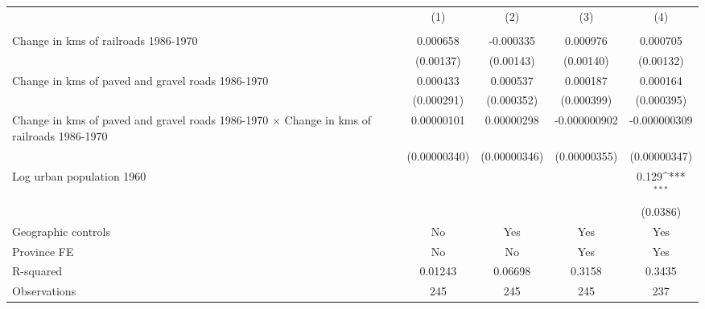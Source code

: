 {
\def\sym#1{\ifmmode^{#1}\else\(^{#1}\)\fi}
\begin{tabular}{l*{4}{c}}
\hline\hline
                &\multicolumn{1}{c}{(1)}&\multicolumn{1}{c}{(2)}&\multicolumn{1}{c}{(3)}&\multicolumn{1}{c}{(4)}\\
                &\multicolumn{1}{c}{}&\multicolumn{1}{c}{}&\multicolumn{1}{c}{}&\multicolumn{1}{c}{}\\
\hline
Change in kms of railroads 1986-1970& 0.000658         &-0.000335         & 0.000976         & 0.000705         \\
                &(0.00137)         &(0.00143)         &(0.00140)         &(0.00132)         \\
[1em]
Change in kms of paved and gravel roads 1986-1970& 0.000433         & 0.000537         & 0.000187         & 0.000164         \\
                &(0.000291)         &(0.000352)         &(0.000399)         &(0.000395)         \\
[1em]
Change in kms of paved and gravel roads 1986-1970 $\times$ Change in kms of railroads 1986-1970&0.00000101         &0.00000298         &-0.000000902         &-0.000000309         \\
                &(0.00000340)         &(0.00000346)         &(0.00000355)         &(0.00000347)         \\
[1em]
Log urban population 1960&                  &                  &                  &    0.129\sym{***}\\
                &                  &                  &                  & (0.0386)         \\
\hline
Geographic controls&       No         &      Yes         &      Yes         &      Yes         \\
Province FE     &       No         &       No         &      Yes         &      Yes         \\
R-squared       &  0.01243         &  0.06698         &   0.3158         &   0.3435         \\
Observations    &      245         &      245         &      245         &      237         \\
\hline\hline
\end{tabular}
}
